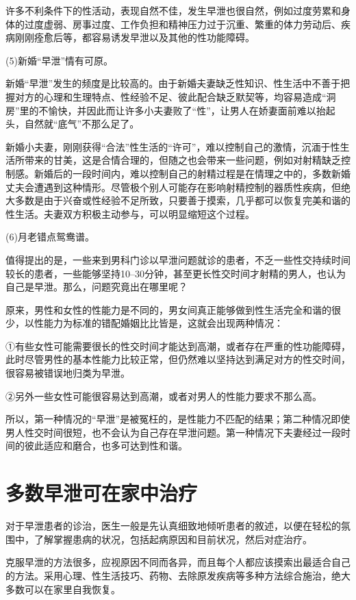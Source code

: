 \documentclass[12pt,UTF8]{ctexbook}
\begin{document}
许多不利条件下的性活动，表现自然不佳，发生早泄也很自然，例如过度劳累和身体的过度虚弱、房事过度、工作负担和精神压力过于沉重、繁重的体力劳动后、疾病刚刚痊愈后等，都容易诱发早泄以及其他的性功能障碍。

(5)新婚“早泄”情有可原。

新婚“早泄”发生的频度是比较高的。由于新婚夫妻缺乏性知识、性生活中不善于把握对方的心理和生理特点、性经验不足、彼此配合缺乏默契等，均容易造成“洞房”里的不愉快，并因此而让许多小夫妻败了“性”，让男人在娇妻面前难以抬起头，自然就“底气”不那么足了。

新婚小夫妻，刚刚获得“合法”性生活的“许可”，难以控制自己的激情，沉湎于性生活所带来的甘美，这是合情合理的，但随之也会带来一些问题，例如对射精缺乏控制感。新婚后的一段时间内，难以控制自己的射精过程是在情理之中的，多数新婚丈夫会遭遇到这种情形。尽管极个别人可能存在影响射精控制的器质性疾病，但绝大多数是由于兴奋或性经验不足所致，只要善于摸索，几乎都可以恢复完美和谐的性生活。夫妻双方积极主动参与，可以明显缩短这个过程。

(6)月老错点鸳鸯谱。

值得提出的是，一些来到男科门诊以早泄问题就诊的患者，不乏一些性交持续时间较长的患者，一些能够坚持10--30分钟，甚至更长性交时间才射精的男人，也认为自己是早泄。那么，问题究竟出在哪里呢？

原来，男性和女性的性能力是不同的，男女间真正能够做到性生活完全和谐的很少，以性能力为标准的错配婚姻比比皆是，这就会出现两种情况：

①有些女性可能需要很长的性交时间才能达到高潮，或者存在严重的性功能障碍，此时尽管男性的基本性能力比较正常，但仍然难以坚持达到满足对方的性交时间，很容易被错误地归类为早泄。

②另外一些女性可能很容易达到高潮，或者对男人的性能力要求不那么高。

所以，第一种情况的“早泄”是被冤枉的，是性能力不匹配的结果；第二种情况即使男人性交时间很短，也不会认为自己存在早泄问题。第一种情况下夫妻经过一段时间的彼此适应和磨合，也多可达到性和谐。

\section{多数早泄可在家中治疗}

对于早泄患者的诊治，医生一般是先认真细致地倾听患者的敘述，以便在轻松的氛围中，了解掌握患病的状况，包括起病原因和目前状况，然后对症治疗。

克服早泄的方法很多，应视原因不同而各异，而且每个人都应该摸索出最适合自己的方法。采用心理、性生活技巧、药物、去除原发疾病等多种方法综合施治，绝大多数可以在家里自我恢复。
\end{document}

